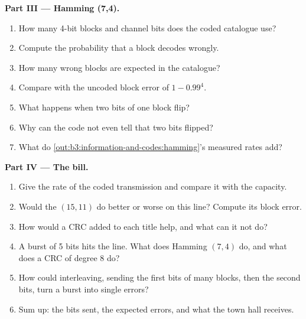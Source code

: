 \begin{problem}
\medskip\noindent\textbf{Part III --- Hamming (7,4).}
\begin{enumerate}[resume]
  \item How many 4-bit blocks and channel bits does the coded catalogue use?
  \item Compute the probability that a block decodes wrongly.
  \item How many wrong blocks are expected in the catalogue?
  \item Compare with the uncoded block error of $1 - 0.99^4$.
  \item What happens when two bits of one block flip?
  \item Why can the code not even tell that two bits flipped?
  \item What do \cref{out:b3:information-and-codes:hamming}'s measured rates add?
\end{enumerate}

\medskip\noindent\textbf{Part IV --- The bill.}
\begin{enumerate}[resume]
  \item Give the rate of the coded transmission and compare it with the capacity.
  \item Would the $(15, 11)$  do better or worse on this line? Compute its block error.
  \item How would a CRC added to each title help, and what can it not do?
  \item A burst of 5 bits hits the line. What does Hamming $(7, 4)$ do, and what does a CRC of degree 8 do?
  \item How could interleaving, sending the first bits of many blocks, then the second bits, turn a burst into single errors?
  \item Sum up: the bits sent, the expected errors, and what the town hall receives.
\end{enumerate}
\end{problem}

